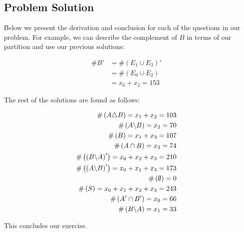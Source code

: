 \subsection{Problem Solution}

Below we present the derivation and conclusion for each of the questions in our problem. For example, we can describe the complement of $ B $ in terms of our partition and use our previous solutions:

\begin{align}
	\# B' 
	&= \#\left(E_1 \cup E_3\right)'\\
	&= \#\left(E_0 \cup E_2\right)\\
	&= x_0 + x_2 = 153
\end{align}

The rest of the solutions are found as follows:

\begin{align}
	\#\left( A\triangle B \right) = x_1+x_2 = 103  \\
	\#\left( A\backslash B \right) = x_2 = 70 \\
	\#\left( B \right) = x_1+x_3=107	\\
	\#\left( A \cap B \right) = x_3 = 74 \\
	\#\left( \left(B\backslash A\right)' \right) 
	= x_0+x_2+x_3 = 210 \\
	\#\left( \left(A\backslash B\right)' \right)
	= x_0+x_1+x_3 = 173 \\
	\#\left( \emptyset \right) = 0 \\
	\#\left( S \right) = x_0+x_1+x_2+x_3 = 243 \\
	\#\left( A' \cap B' \right) = x_0 = 66\\
	\#\left( B\backslash A \right) = x_1 = 33
\end{align}

This concludes our exercise.
